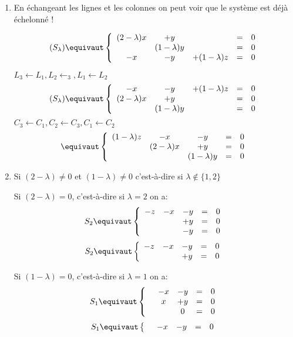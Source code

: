 \begin{correction}
\begin{enumerate}
\item En échangeant les lignes et les colonnes on peut voir que le système est déjà échelonné ! 

$$(S_\lambda)\equivaut  \left\{ \begin{array}{ccccc}
(2-\lambda)x &+y& & =&0 \\
 &(1-\lambda)y & & =& 0 \\
 -x&-y&+(1-\lambda)z&=&0
\end{array}\right. $$

$L_3\leftarrow L_1, L_2 \leftarrow _3, L_1\leftarrow L_2$
$$
(S_\lambda)\equivaut  \left\{ \begin{array}{ccccc}
 -x&-y&+(1-\lambda)z&=&0\\
(2-\lambda)x &+y& & =&0 \\
 &(1-\lambda)y & & =& 0 
\end{array}\right.$$
$ C_3\leftarrow C_1, C_2 \leftarrow C_3, C_1\leftarrow C_2$
$$
\equivaut \left\{ \begin{array}{ccccc}
 (1-\lambda)z&-x&-y&=&0\\
 &(2-\lambda)x&+y & =&0 \\
 &  & (1-\lambda)y& =& 0 
\end{array}\right.$$


\item Si $(2-\lambda)\neq 0$ et $(1-\lambda)\neq 0$ c'est-à-dire si $\lambda \notin\{ 1,2\}$ 

Si  $(2-\lambda)= 0$,  c'est-à-dire si $\lambda=2$ on a:
$$S_2\equivaut  \left\{ \begin{array}{ccccc}
 -z&-x&-y&=&0\\
 & &+y & =&0 \\
 &  & -y& =& 0 
\end{array}\right.$$
$$S_2\equivaut  \left\{ \begin{array}{ccccc}
 -z&-x&-y&=&0\\
 & &+y & =&0 
\end{array}\right.$$

Si  $(1-\lambda)= 0$,  c'est-à-dire si $\lambda=1$ on a:
$$S_1\equivaut  \left\{ \begin{array}{ccccc}
 &-x&-y&=&0\\
 & x&+y & =&0 \\
 &  &0 & =& 0 
\end{array}\right.$$
$$S_1\equivaut  \left\{ \begin{array}{ccccc}
 &-x&-y&=&0
\end{array}\right.$$



\end{enumerate}
\end{correction}
